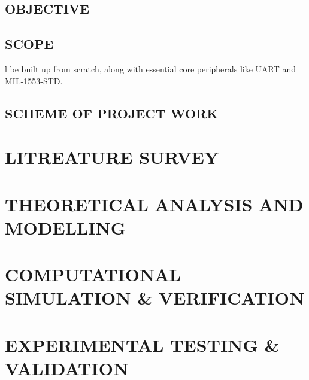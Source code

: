 \documentclass[12pt,a4paper]{report}
\begin{document}
\section{\small \MakeUppercase{Objective}}
\section{\small \MakeUppercase{Scope}}
l be built up from scratch, along with essential core peripherals like UART and MIL-1553-STD. 
\section{\small \MakeUppercase{Scheme of Project Work}}
\chapter{\large \MakeUppercase{Litreature Survey}}
\chapter{\large \MakeUppercase {Theoretical Analysis and Modelling}}
\chapter{\large \MakeUppercase {Computational Simulation \& verification}}
\chapter{\large \MakeUppercase {Experimental Testing \& Validation}}
\end{document}
